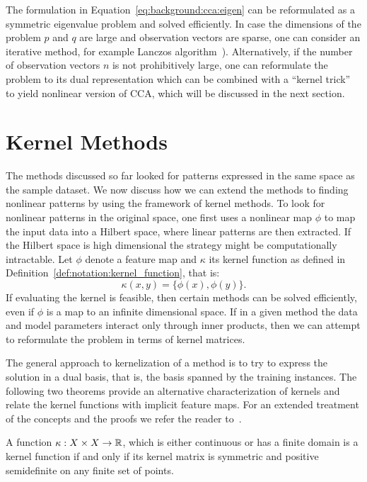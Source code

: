 The formulation in Equation~\ref{eq:background:cca:eigen} can be reformulated as a symmetric eigenvalue
problem and solved efficiently. In case the dimensions of the problem $p$ and $q$ are large and
observation vectors are sparse, one can consider an iterative method, for example Lanczos
algorithm~\cite{LAL}). Alternatively, if the number of observation vectors $n$ is not prohibitively
large, one can reformulate the problem to its dual representation which can be combined with a ``kernel trick''~\cite{FBMJ}
to yield nonlinear version of CCA, which will be discussed in the next section.

\section{Kernel Methods}\label{chap:background:kernels}
The methods discussed so far looked for patterns expressed in the same space as the sample dataset. We now discuss how we can extend the methods to finding nonlinear patterns by using the framework of kernel methods.
To look for nonlinear patterns in the original space, one first uses a nonlinear map $\phi$ to map the input data into a Hilbert space, where linear patterns are then extracted. If the Hilbert space is high dimensional the strategy might be computationally intractable.
Let $\phi$ denote a feature map and $\kappa$ its kernel function as defined in Definition~\ref{def:notation:kernel_function}, that is:
$$ \kappa(x,y) = \lbrace \phi(x), \phi(y) \rbrace.$$
If evaluating the kernel is feasible, then certain methods can be solved efficiently, even
if $\phi$ is a map to an infinite dimensional space. If in a given method the data and model parameters interact only through inner products, then
we can attempt to reformulate the problem in terms of kernel matrices.

The general approach to kernelization of a method is to try to express the solution in a dual basis, that is, the basis spanned by the training instances.
The following two theorems provide an alternative characterization of kernels and relate the kernel functions with implicit feature maps. For an extended
treatment of the concepts and the proofs we refer the reader to~\cite{shawe-taylor04kernel}.

\begin{theorem}\label{thm:background:kernel_function}
A function $\kappa: X \times X \rightarrow \mathbb{R}$, which is either continuous or has a finite domain
is a kernel function if and only if its kernel matrix is symmetric and positive semidefinite on any finite set of points.
\end{theorem}

